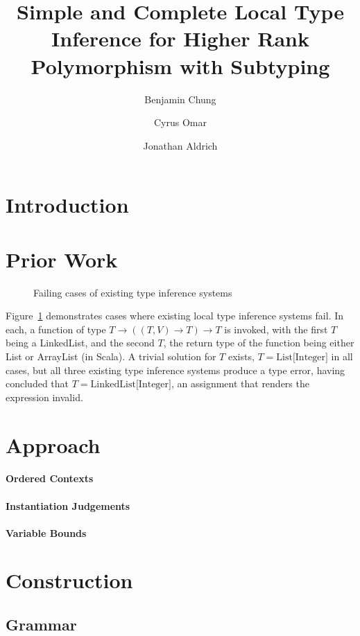 \documentclass{llncs}
\title{Simple and Complete Local Type Inference for Higher Rank Polymorphism with Subtyping}
\author{Benjamin Chung\and Cyrus Omar \and Jonathan Aldrich}
\institute{\email{\{bwchung,comar,aldrich\}@cs.cmu.edu}\\Carnegie Mellon University}
\begin{document}
\maketitle
\begin{abstract}
\end{abstract}

\section{Introduction}
\section{Prior Work}

\begin{figure}

\caption{Failing cases of existing type inference systems}
\label{fig:cons}
\end{figure}

Figure~\ref{fig:cons} demonstrates cases where existing local type inference systems fail. In each, a function of type $T \rightarrow ((T,V) \rightarrow T) \rightarrow T$ is invoked, with the first $T$ being a LinkedList, and the second $T$, the return type of the function being either List or ArrayList (in Scala). A trivial solution for $T$ exists, $T=\text{List[Integer]}$ in all cases, but all three existing type inference systems produce a type error, having concluded that $T=\text{LinkedList[Integer]}$, an assignment that renders the expression invalid.

\section{Approach}
\paragraph{Ordered Contexts}
\paragraph{Instantiation Judgements}
\paragraph{Variable Bounds}


\section{Construction}
\subsection{Grammar}
\end{document}
